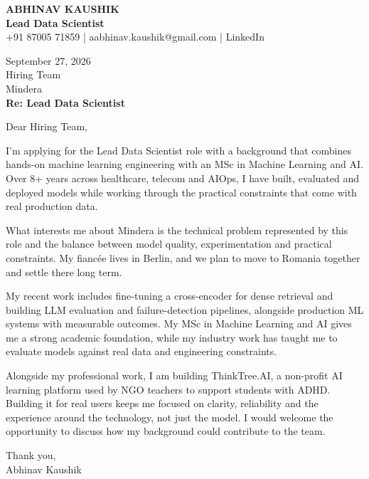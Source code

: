 \documentclass[10pt,a4paper]{article}
\begin{document}
\begin{center}
{\Large\bfseries ABHINAV KAUSHIK}\\[2pt]
{\bfseries Lead Data Scientist}\\[2pt]
+91 87005 71859 \quad | \quad aabhinav.kaushik@gmail.com \quad | \quad LinkedIn
\end{center}
\vspace{8pt}
September 27, 2026\\[6pt]
Hiring Team\\
Mindera\\[4pt]
\textbf{Re: Lead Data Scientist}

Dear Hiring Team,

I’m applying for the Lead Data Scientist role with a background that combines hands-on machine learning engineering with an MSc in Machine Learning and AI. Over 8+ years across healthcare, telecom and AIOps, I have built, evaluated and deployed models while working through the practical constraints that come with real production data.

What interests me about Mindera is the technical problem represented by this role and the balance between model quality, experimentation and practical constraints. My fiancée lives in Berlin, and we plan to move to Romania together and settle there long term.

My recent work includes fine-tuning a cross-encoder for dense retrieval and building LLM evaluation and failure-detection pipelines, alongside production ML systems with measurable outcomes. My MSc in Machine Learning and AI gives me a strong academic foundation, while my industry work has taught me to evaluate models against real data and engineering constraints.

Alongside my professional work, I am building ThinkTree.AI, a non-profit AI learning platform used by NGO teachers to support students with ADHD. Building it for real users keeps me focused on clarity, reliability and the experience around the technology, not just the model. I would welcome the opportunity to discuss how my background could contribute to the team.

Thank you,\\
Abhinav Kaushik
\end{document}
